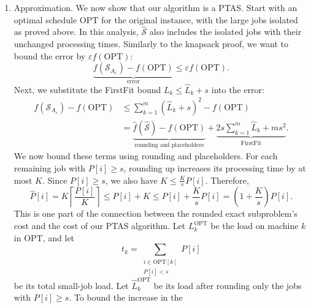 \documentclass[12pt,a4paper]{article}
\theoremstyle{definition}
\theoremstyle{plain}
\begin{document}
\begin{enumerate}
Let us analyze the number of distinct processing times. All $q$
placeholders have processing time $s$, so together they contribute at
most one type. The other jobs satisfy $s\leq P[i]<\overline{L}$ and are
rounded up to multiples of $K$. Hence,
\[
C\leq 1+\left\lceil\frac{\overline{L}}{K}\right\rceil.
\]
We can therefore deduce one condition on our choice of $K$:
choose
\[
K=\alpha(\varepsilon)\overline{L},
\qquad \alpha(\varepsilon)>0.
\]
Then $C\leq1+\lceil1/\alpha(\varepsilon)\rceil$ depends only on
$\varepsilon$. We will determine $\alpha(\varepsilon)$ during the
approximation analysis.
Given such a choice of $K$, the total running time is
\[
O\!\left(nm+mC(n+1)^{2C}\right)\in\operatorname{poly}(|\mathcal{I}|)
\qquad\text{for every fixed }\varepsilon>0.
\]
\item Approximation. We now show that our algorithm is a PTAS.
Start with an optimal schedule $\mathrm{OPT}$ for the original instance,
with the large jobs isolated as proved above.
In this analysis, $\widehat{\mathcal{S}}$ also includes the isolated jobs
with their unchanged processing times.
Similarly to the knapsack proof, we want to bound the error by
$\varepsilon f(\mathrm{OPT})$:
\[
\underbrace{f(\mathcal{S}_{A_\varepsilon})-f(\mathrm{OPT})}_{\text{error}}
\leq\varepsilon f(\mathrm{OPT}).
\]
Next, we substitute the FirstFit bound $L_k\leq\widehat{L}_k+s$ into
the error:
\[
\begin{aligned}
f(\mathcal{S}_{A_\varepsilon})-f(\mathrm{OPT})
&\leq\sum_{k=1}^m(\widehat{L}_k+s)^2-f(\mathrm{OPT})\\
&=\underbrace{\widehat{f}(\widehat{\mathcal{S}})-f(\mathrm{OPT})}_{\text{rounding and placeholders}}
+\underbrace{2s\sum_{k=1}^m\widehat{L}_k+ms^2}_{\text{FirstFit}}.
\end{aligned}
\]
We now bound these terms using rounding and placeholders.
For each remaining job with $P[i]\geq s$, rounding up increases its
processing time by at most $K$. Since $P[i]\geq s$, we also have
$K\leq \frac{K}{s}P[i]$. Therefore,
\[
\widehat{P}[i]
=K\left\lceil\frac{P[i]}{K}\right\rceil
\leq P[i]+K
\leq P[i]+\frac{K}{s}P[i]
=\left(1+\frac{K}{s}\right)P[i].
\]
This is one part of the connection between the rounded exact subproblem's
cost and the cost of our PTAS algorithm. Let $L_k^{\mathrm{OPT}}$ be the
load on machine $k$ in $\mathrm{OPT}$, and let
\[
t_k=\sum_{\substack{i\in\mathrm{OPT}[k]\\P[i]<s}}P[i]
\]
be its total small-job load. Let $\widehat{L}_k^{\mathrm{OPT}}$ be its load
after rounding only the jobs with $P[i]\geq s$.
To bound the increase in the

\end{enumerate}
\end{document}
